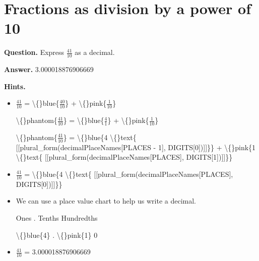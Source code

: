 \documentclass{article}
\begin{document}
\section*{Fractions as division by a power of 10}
\textbf{Question.} Express $\frac{41}{10}$ as a decimal.

\textbf{Answer.} 3.000018876906669

\textbf{Hints.}
\begin{itemize}
  \item $\frac{41}{10}$ = 
                        \textbackslash\{\}blue\{$\frac{40}{10}$\} +
                        \textbackslash\{\}pink\{$\frac{1}{10}$\}
                    

                    
                        \textbackslash\{\}phantom\{$\frac{41}{10}$\} = 
                        \textbackslash\{\}blue\{$\frac{4}{1}$\} +
                        \textbackslash\{\}pink\{$\frac{1}{10}$\}
                    

                    
                        \textbackslash\{\}phantom\{$\frac{41}{10}$\} = 
                        \textbackslash\{\}blue\{4 \textbackslash\{\}text\{ [[plural\_form(decimalPlaceNames[PLACES - 1], DIGITS[0])]]\}\} +
                        \textbackslash\{\}pink\{1 \textbackslash\{\}text\{ [[plural\_form(decimalPlaceNames[PLACES], DIGITS[1])]]\}\}
  \item $\frac{41}{10}$ = 
                        \textbackslash\{\}blue\{4 \textbackslash\{\}text\{ [[plural\_form(decimalPlaceNames[PLACES], DIGITS[0])]]\}\}
  \item We can use a place value chart to help us write a decimal.
                    
                        
                            
                                Ones
                                .
                                Tenths
                                Hundredths
                            
                        
                        
                            
                                \textbackslash\{\}blue\{4\}
                                .
                                \textbackslash\{\}pink\{1\}
                                0
  \item $\frac{41}{10}$ = 3.000018876906669
\end{itemize}
\end{document}
